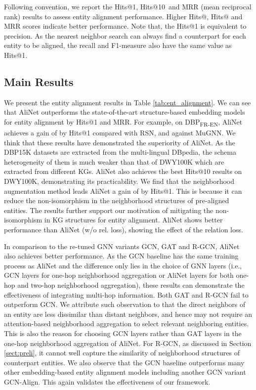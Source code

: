 \documentclass[letterpaper]{article} \usepackage{aaai20}  \usepackage{times}  \usepackage{helvet} \usepackage{courier}  \usepackage[hyphens]{url}  \usepackage{graphicx} \urlstyle{rm} \def\UrlFont{\rm}  \frenchspacing  \setlength{\pdfpagewidth}{8.5in}  \setlength{\pdfpageheight}{11in}  \usepackage{amsmath}
\begin{document}
Following convention, we report the Hits@1, Hits@10~and MRR (mean reciprocal rank) results to assess entity alignment performance. Higher Hits@, Hits@ and MRR scores indicate better performance. Note that, the Hits@1 is equivalent to precision. As the nearest neighbor search can always find a counterpart for each entity to be aligned, the recall and F1-measure also have the same value as Hits@1. 

\subsection{Main Results}
We present the entity alignment results in Table \ref{tab:ent_alignment}. We can see that AliNet outperforms the state-of-the-art structure-based embedding models for entity alignment by Hits@1 and MRR. For example, on DBP\textsubscript{FR-EN}, AliNet achieves a gain of  by Hits@1 compared with RSN, and  against MuGNN. We think that these results have demonstrated the superiority of AliNet. As the DBP15K datasets are extracted from the multi-lingual DBpedia, the schema heterogeneity of them is much weaker than that of DWY100K which are extracted from different KGs. AliNet also achieves the best Hits@10 results on DWY100K, demonstrating its practicability. We find that the neighborhood augmentation method leads AliNet a gain of  by Hits@1. This is because it can reduce the non-isomorphism in the neighborhood structures of pre-aligned entities. The results further support our motivation of mitigating the non-isomorphism in KG structures for entity alignment. AliNet shows better performance than AliNet (w/o rel. loss), showing the effect of the relation loss.
 
In comparison to the re-tuned GNN variants GCN, GAT and R-GCN, AliNet also achieves better performance. As the GCN baseline has the same training process as AliNet and the difference only lies in the choice of GNN layers (i.e., GCN layers for one-hop neighborhood aggregation or AliNet layers for both one-hop and two-hop neighborhood aggregation), these results can demonstrate the effectiveness of integrating multi-hop information. Both GAT and R-GCN fail to outperform GCN. We attribute such observation to that the direct neighbors of an entity are less dissimilar than distant neighbors, and hence may not require an attention-based neighborhood aggregation to select relevant neighboring entities. This is also the reason for choosing GCN layers rather than GAT layers in the one-hop neighborhood aggregation of AliNet. For R-GCN, as discussed in Section \ref{sect:preli}, it cannot well capture the similarity of neighborhood structures of counterpart entities.  We also observe that the GCN baseline outperforms many other embedding-based entity alignment models including another GCN variant GCN-Align. This again validates the effectiveness of our framework. 
\end{document}
